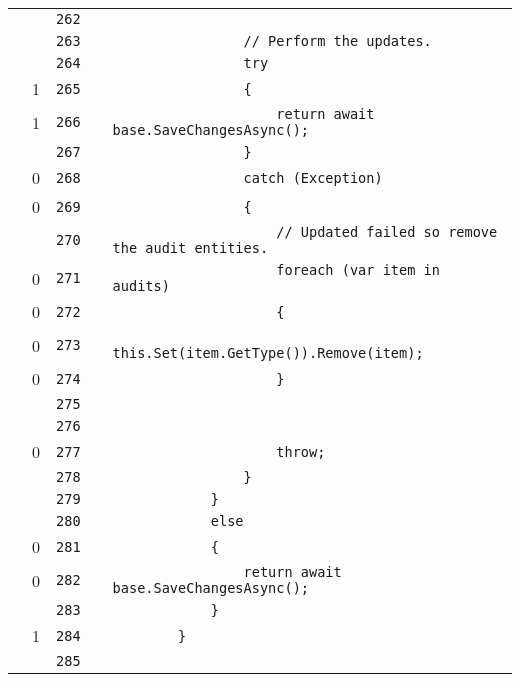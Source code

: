 \documentclass[a4paper,10pt]{article}
\begin{document}
\begin{longtable}[l]{lrrll}
\cellcolor{gray} &  & \verb~262~ & & \verb~~\\
\cellcolor{gray} &  & \verb~263~ & & \verb~                // Perform the updates.~\\
\cellcolor{gray} &  & \verb~264~ & & \verb~                try~\\
\cellcolor{green} & 1 & \verb~265~ & & \verb~                {~\\
\cellcolor{green} & 1 & \verb~266~ & & \verb~                    return await base.SaveChangesAsync();~\\
\cellcolor{gray} &  & \verb~267~ & & \verb~                }~\\
\cellcolor{red} & 0 & \verb~268~ & & \verb~                catch (Exception)~\\
\cellcolor{red} & 0 & \verb~269~ & & \verb~                {~\\
\cellcolor{gray} &  & \verb~270~ & & \verb~                    // Updated failed so remove the audit entities.~\\
\cellcolor{red} & 0 & \verb~271~ & & \verb~                    foreach (var item in audits)~\\
\cellcolor{red} & 0 & \verb~272~ & & \verb~                    {~\\
\cellcolor{red} & 0 & \verb~273~ & & \verb~                        this.Set(item.GetType()).Remove(item);~\\
\cellcolor{red} & 0 & \verb~274~ & & \verb~                    }~\\
\cellcolor{gray} &  & \verb~275~ & & \verb~~\\
\cellcolor{gray} &  & \verb~276~ & & \verb~~\\
\cellcolor{red} & 0 & \verb~277~ & & \verb~                    throw;~\\
\cellcolor{gray} &  & \verb~278~ & & \verb~                }~\\
\cellcolor{gray} &  & \verb~279~ & & \verb~            }~\\
\cellcolor{gray} &  & \verb~280~ & & \verb~            else~\\
\cellcolor{red} & 0 & \verb~281~ & & \verb~            {~\\
\cellcolor{red} & 0 & \verb~282~ & & \verb~                return await base.SaveChangesAsync();~\\
\cellcolor{gray} &  & \verb~283~ & & \verb~            }~\\
\cellcolor{green} & 1 & \verb~284~ & & \verb~        }~\\
\cellcolor{gray} &  & \verb~285~ & & \verb~~\\

\end{longtable}
\end{document}
